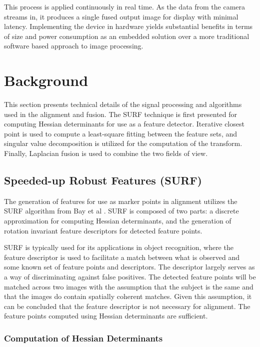 \documentclass[sigconf]{acmart}
\begin{document}
This process is applied continuously in real time. As the data from the camera streams in, it produces a single fused output image for display with minimal latency. Implementing the device in hardware yields substantial benefits in terms of size and power consumption as an embedded solution over a more traditional software based approach to image processing.

\section{Background}
This section presents technical details of the signal processing and algorithms used in the alignment and fusion. The SURF technique is first presented for computing Hessian determinants for use as a feature detector. Iterative closest point is used to compute a least-square fitting between the feature sets, and singular value decomposition is utilized for the computation of the transform. Finally, Laplacian fusion is used to combine the two fields of view.

\subsection{Speeded-up Robust Features (SURF)}

The generation of features for use as marker points in alignment utilizes the SURF algorithm from Bay et al \cite{bay_surf:_2006}. SURF is composed of two parts: a discrete approximation for computing Hessian determinants, and the generation of rotation invariant feature descriptors for detected feature points. 

SURF is typically used for its applications in object recognition, where the feature descriptor is used to facilitate a match between what is observed and some known set of feature points and descriptors. The descriptor largely serves as a way of discriminating against false positives. The detected feature points will be matched across two images with the assumption that the subject is the same and that the images do contain spatially coherent matches. Given this assumption, it can be concluded that the feature descriptor is not necessary for alignment. The feature points computed using Hessian determinants are sufficient.

\subsubsection{Computation of Hessian Determinants}
\end{document}
